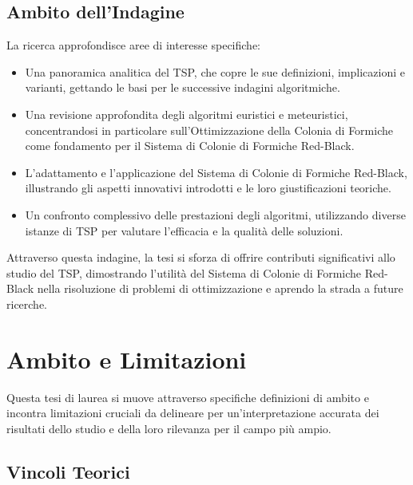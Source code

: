 \subsection{Ambito dell'Indagine}

La ricerca approfondisce aree di interesse specifiche:

\begin{itemize}
	\item Una panoramica analitica del \gls{TSP}, che copre le sue definizioni, implicazioni e varianti, gettando le basi per le successive indagini algoritmiche.
	\item Una revisione approfondita degli algoritmi euristici e meteuristici, concentrandosi in particolare sull'Ottimizzazione della Colonia di Formiche come fondamento per il Sistema di Colonie di Formiche Red-Black.
	\item L'adattamento e l'applicazione del Sistema di Colonie di Formiche Red-Black, illustrando gli aspetti innovativi introdotti e le loro giustificazioni teoriche.
	\item Un confronto complessivo delle prestazioni degli algoritmi, utilizzando diverse istanze di \gls{TSP} per valutare l'efficacia e la qualità delle soluzioni.
\end{itemize}

Attraverso questa indagine, la tesi si sforza di offrire contributi significativi allo studio del \gls{TSP}, dimostrando l'utilità del Sistema di Colonie di Formiche Red-Black nella risoluzione di problemi di ottimizzazione e aprendo la strada a future ricerche.

\section{Ambito e Limitazioni}

Questa tesi di laurea si muove attraverso specifiche definizioni di ambito e incontra limitazioni cruciali da delineare per un'interpretazione accurata dei risultati dello studio e della loro rilevanza per il campo più ampio.

\subsection{Vincoli Teorici}

